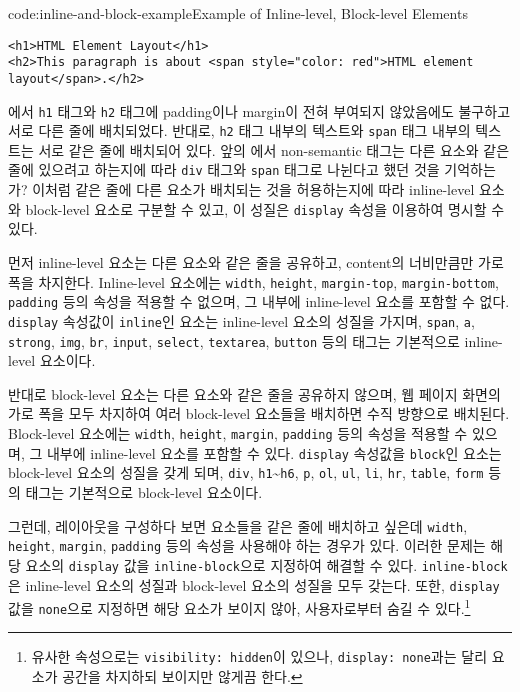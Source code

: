 \begin{codeenv}{code:inline-and-block-example}{Example of Inline-level, Block-level Elements}\begin{verbatim}
<h1>HTML Element Layout</h1>
<h2>This paragraph is about <span style="color: red">HTML element layout</span>.</h2>
\end{verbatim}
\end{codeenv}

에서 \texttt{h1} 태그와 \texttt{h2} 태그에 padding이나 margin이 전혀 부여되지 않았음에도 불구하고 서로 다른 줄에 배치되었다. 반대로, \texttt{h2} 태그 내부의 텍스트와 \texttt{span} 태그 내부의 텍스트는 서로 같은 줄에 배치되어 있다. 앞의 에서 non-semantic 태그는 다른 요소와 같은 줄에 있으려고 하는지에 따라 \texttt{div} 태그와 \texttt{span} 태그로 나뉜다고 했던 것을 기억하는가? 이처럼 같은 줄에 다른 요소가 배치되는 것을 허용하는지에 따라 inline-level 요소와 block-level 요소로 구분할 수 있고, 이 성질은 \texttt{display} 속성을 이용하여 명시할 수 있다.

먼저 inline-level 요소는 다른 요소와 같은 줄을 공유하고, content의 너비만큼만 가로 폭을 차지한다. Inline-level 요소에는 \texttt{width}, \texttt{height}, \texttt{margin-top}, \texttt{margin-bottom}, \texttt{padding} 등의 속성을 적용할 수 없으며, 그 내부에 inline-level 요소를 포함할 수 없다. \texttt{display} 속성값이 \texttt{inline}인 요소는 inline-level 요소의 성질을 가지며, \texttt{span}, \texttt{a}, \texttt{strong}, \texttt{img}, \texttt{br}, \texttt{input}, \texttt{select}, \texttt{textarea}, \texttt{button} 등의 태그는 기본적으로 inline-level 요소이다. 

반대로 block-level 요소는 다른 요소와 같은 줄을 공유하지 않으며, 웹 페이지 화면의 가로 폭을 모두 차지하여 여러 block-level 요소들을 배치하면 수직 방향으로 배치된다. Block-level 요소에는 \texttt{width}, \texttt{height}, \texttt{margin}, \texttt{padding} 등의 속성을 적용할 수 있으며, 그 내부에 inline-level 요소를 포함할 수 있다. \texttt{display} 속성값을 \texttt{block}인 요소는 block-level 요소의 성질을 갖게 되며, \texttt{div}, \texttt{h1}\textasciitilde\texttt{h6}, \texttt{p}, \texttt{ol}, \texttt{ul}, \texttt{li}, \texttt{hr}, \texttt{table}, \texttt{form} 등의 태그는 기본적으로 block-level 요소이다.

그런데, 레이아웃을 구성하다 보면 요소들을 같은 줄에 배치하고 싶은데 \texttt{width}, \texttt{height}, \texttt{margin}, \texttt{padding} 등의 속성을 사용해야 하는 경우가 있다. 이러한 문제는 해당 요소의 \texttt{display} 값을 \texttt{inline-block}으로 지정하여 해결할 수 있다. \texttt{inline-block}은 inline-level 요소의 성질과 block-level 요소의 성질을 모두 갖는다. 또한, \texttt{display} 값을 \texttt{none}으로 지정하면 해당 요소가 보이지 않아, 사용자로부터 숨길 수 있다.\footnote{유사한 속성으로는 \texttt{visibility: hidden}이 있으나, \texttt{display: none}과는 달리 요소가 공간을 차지하되 보이지만 않게끔 한다.}
 
